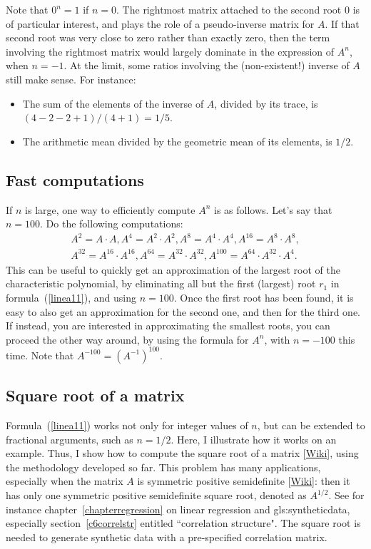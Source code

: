 \documentclass[oneside,10pt]{book}
\begin{document}
Note that $0^n=1$ if $n=0$. The rightmost matrix attached to the second root $0$ is of particular interest, and plays the role of a pseudo-inverse matrix for $A$. If that second root was very close to zero rather than exactly zero, then the term involving the rightmost matrix would largely dominate in the expression of $A^n$, when $n = -1$. At the limit, some ratios involving the (non-existent!) inverse of $A$ still make sense. For instance:
\begin{itemize}
\item The sum of the elements of the inverse of $A$, divided by its trace, is $(4 - 2 - 2 + 1) / (4 + 1) = 1 / 5$.
\item The arithmetic mean divided by the geometric mean of its elements, is $1 / 2$.
\end{itemize}

\subsection{Fast computations}

If $n$ is large, one way to efficiently compute $A^n$ is as follows. Let's say that $n = 100$. Do the following computations:
\begin{align*}
 A^2=A\cdot A, A^4 = A^2\cdot A^2, A^8=A^4\cdot A^4,A^{16}=A^8\cdot A^8, \\
A^{32}=A^{16}\cdot A^{16}, A^{64}=A^{32}\cdot A^{32}, A^{100}=A^{64}\cdot A^{32}\cdot A^4.
\end{align*}
\noindent This can be useful to quickly get an approximation of the largest root of the characteristic polynomial, by eliminating all but the first (largest) root $r_1$ in formula~(\ref{linea11}), and using $n = 100$. Once the first root has been found, it is easy to also get an approximation for the second one, and then for the third one. If instead, you are interested in approximating the smallest roots, you can proceed the other way around, by using the formula for $A^n$, with $n = -100$ this time. Note that $A^{-100}=(A^{-1})^{100}$.

\subsection{Square root of a matrix}

Formula~(\ref{linea11}) works not only for integer values of $n$, but can be extended to fractional arguments, such as $n=1/2$. Here, I illustrate how it works on an example. Thus, I show how to compute the \textcolor{index}{square root of a matrix} [\href{https://en.wikipedia.org/wiki/Square_root_of_a_matrix}{Wiki}], using the methodology developed so far. This problem has many applications, especially when the matrix $A$ is
symmetric \textcolor{index}{positive semidefinite} [\href{https://en.wikipedia.org/wiki/Definite_matrix}{Wiki}]: then it has only one symmetric
positive semidefinite square root, denoted as $A^{1/2}$. See for instance chapter~\ref{chapterregression} on linear regression and \gls{gls:syntheticdata}, especially section~\ref{c6correlstr} entitled ``correlation structure". The square root is needed to generate synthetic data with a pre-specified correlation matrix.
\end{document}
